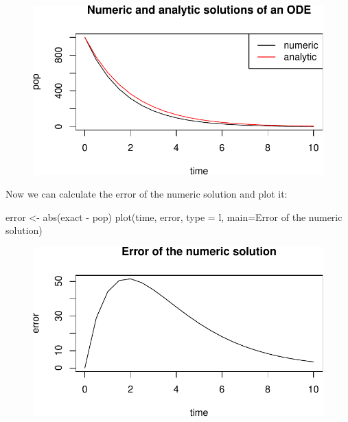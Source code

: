 \documentclass[
  letterpaper,
  DIV=11,
  numbers=noendperiod]{scrreprt}
\newenvironment{Shaded}{\begin{snugshade}}{\end{snugshade}}
\newcommand{\AttributeTok}[1]{\textcolor[rgb]{0.40,0.45,0.13}{#1}}
\newcommand{\FunctionTok}[1]{\textcolor[rgb]{0.28,0.35,0.67}{#1}}
\newcommand{\NormalTok}[1]{\textcolor[rgb]{0.00,0.23,0.31}{#1}}
\newcommand{\OtherTok}[1]{\textcolor[rgb]{0.00,0.23,0.31}{#1}}
\newcommand{\SpecialCharTok}[1]{\textcolor[rgb]{0.37,0.37,0.37}{#1}}
\newcommand{\StringTok}[1]{\textcolor[rgb]{0.13,0.47,0.30}{#1}}
\begin{document}
\begin{figure}[H]

{\centering \includegraphics{./ode_sols_files/figure-pdf/unnamed-chunk-4-1.pdf}

}

\end{figure}

Now we can calculate the error of the numeric solution and plot it:

\begin{Shaded}
\begin{Highlighting}[]
\NormalTok{error }\OtherTok{\textless{}{-}} \FunctionTok{abs}\NormalTok{(exact }\SpecialCharTok{{-}}\NormalTok{ pop)}
\FunctionTok{plot}\NormalTok{(time, error, }\AttributeTok{type =} \StringTok{\textquotesingle{}l\textquotesingle{}}\NormalTok{, }\AttributeTok{main=}\StringTok{\textquotesingle{}Error of the numeric solution\textquotesingle{}}\NormalTok{)}
\end{Highlighting}
\end{Shaded}

\begin{figure}[H]

{\centering \includegraphics{./ode_sols_files/figure-pdf/unnamed-chunk-5-1.pdf}

}

\end{figure}
\end{document}
